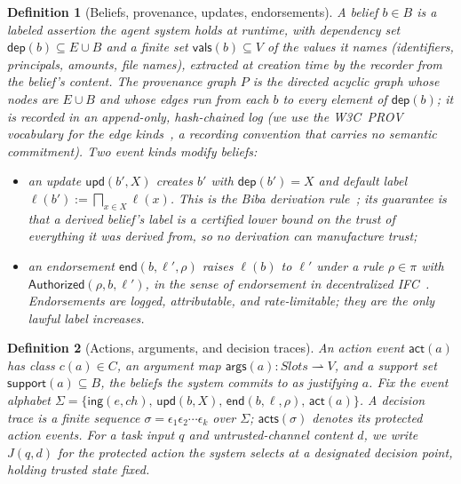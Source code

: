 \documentclass[conference,compsoc]{IEEEtran}
\newtheorem{definition}{Definition}
\theoremstyle{definition}
\theoremstyle{plain}
\newcommand{\deps}{\ensuremath{\mathsf{dep}}}
\newcommand{\support}{\ensuremath{\mathsf{support}}}
\newcommand{\acts}{\ensuremath{\mathsf{acts}}}
\newcommand{\args}{\ensuremath{\mathsf{args}}}
\newcommand{\vals}{\ensuremath{\mathsf{vals}}}
\newcommand{\ev}[1]{\ensuremath{\mathsf{#1}}}
\begin{document}
\begin{definition}[Beliefs, provenance, updates, endorsements]
\label{def:beliefs}
A \emph{belief} $b \in B$ is a labeled assertion the agent system holds
at runtime, with dependency set $\deps(b) \subseteq E \cup B$ and a
finite set $\vals(b) \subseteq V$ of the values it names (identifiers,
principals, amounts, file names), extracted at creation time by the
recorder from the belief's content. The \emph{provenance graph} $P$ is
the directed acyclic graph whose nodes are $E \cup B$ and whose edges
run from each $b$ to every element of $\deps(b)$; it is recorded in an
append-only, hash-chained log (we use the W3C~PROV vocabulary for the
edge kinds~\cite{prov}, a recording convention that carries no semantic
commitment). Two event kinds modify beliefs:
\begin{itemize}[leftmargin=1.15em,itemsep=1pt]
\item an \emph{update} $\ev{upd}(b', X)$ creates $b'$ with
$\deps(b') = X$ and default label
$\ell(b') := \bigsqcap_{x \in X} \ell(x)$. This is the Biba derivation
rule~\cite{biba}; its guarantee is that a derived belief's label is a
certified lower bound on the trust of everything it was derived from,
so no derivation can manufacture trust;
\item an \emph{endorsement} $\ev{end}(b, \ell', \rho)$ raises
$\ell(b)$ to $\ell'$ under a rule $\rho \in \pi$ with
$\mathsf{Authorized}(\rho, b, \ell')$, in the sense of endorsement in
decentralized IFC~\cite{myersliskov}. Endorsements are logged,
attributable, and rate-limitable; they are the only lawful label
increases.
\end{itemize}
\end{definition}

\begin{definition}[Actions, arguments, and decision traces]
\label{def:actions}
An \emph{action event} $\ev{act}(a)$ has class $c(a) \in C$, an
\emph{argument map} $\args(a) : \mathit{Slots} \rightharpoonup V$, and a
\emph{support set} $\support(a) \subseteq B$, the beliefs the system
commits to as justifying $a$. Fix the event alphabet
$\Sigma = \{ \ev{ing}(e, ch),\, \ev{upd}(b, X),\, \ev{end}(b, \ell, \rho),\, \ev{act}(a) \}$.
A \emph{decision trace} is a finite sequence
$\sigma = \epsilon_1 \epsilon_2 \cdots \epsilon_k$ over $\Sigma$;
$\acts(\sigma)$ denotes its protected action events. For a task input
$q$ and untrusted-channel content $d$, we write $J(q, d)$ for the
protected action the system selects at a designated decision point,
holding trusted state fixed.
\end{definition}
\end{document}
